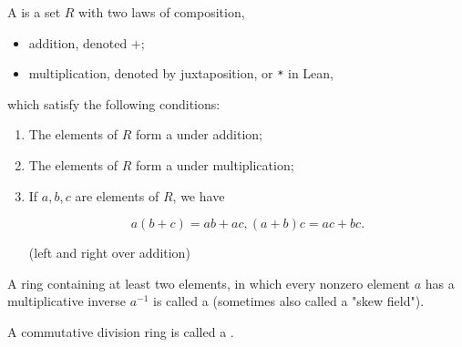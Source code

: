 \begin{definition}[Ring]
    \label{Ring}
    \leanok

    A  is a set $R$ with two laws of composition, 
    
    \begin{itemize}
        
    \item addition, denoted $+$;
    \item multiplication, denoted by juxtaposition, or \texttt{*} in Lean,
    
    \end{itemize}
    
    which satisfy the following conditions:

    \begin{enumerate}
    \item The elements of $R$ form a  under addition;

    \item The elements of $R$ form a  under multiplication;

    \item If $a, b, c$ are elements of $R$, we have

    $$
    a (b + c) = a b + a c, (a + b) c = a c + b c.
    $$

    (left and right  over addition)

    \end{enumerate}

\end{definition}

\begin{definition}
    \label{DivisionRing}
    \leanok

    A ring containing at least two elements, in which
    every nonzero element $a$ has a multiplicative inverse $a^{-1}$ is called a  
    (sometimes also called a "skew field").

\end{definition}

\begin{definition}[Field]
    \label{Field}
    \leanok

    A commutative division ring is called a .

\end{definition}

